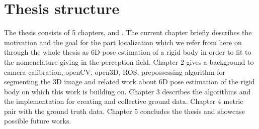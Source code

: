 \section{Thesis structure}
The thesis consists of 5 chapters,  and . The current chapter briefly describes the motivation and the goal for the part localization which we refer from here on through the whole thesis as 6D pose estimation of a rigid body in order to fit to the nomenclature giving in the perception field. 
Chapter 2 gives a background to camera calibration, openCV, open3D, ROS, prepossessing algorithm for segmenting the 3D image and related work about 6D pose estimation of the rigid body on which this work is building on. Chapter 3 describes the algorithms and the implementation for creating and collective ground data.  Chapter 4 metric pair with the ground truth data. Chapter 5 concludes the thesis and showcase possible future works.

